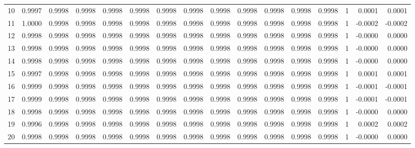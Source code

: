 \begin{tabular}{lrrrrrrrrrrrrrrr}
10  &      0.9997 &  0.9998 &  0.9998 &  0.9998 &  0.9998 &  0.9998 &  0.9998 &  0.9998 &  0.9998 &  0.9998 &   0.9998 &     0.9998 &      1 &                    0.0001 &                     0.0001 \\
11  &      1.0000 &  0.9998 &  0.9998 &  0.9998 &  0.9998 &  0.9998 &  0.9998 &  0.9998 &  0.9998 &  0.9998 &   0.9998 &     0.9998 &      1 &                   -0.0002 &                    -0.0002 \\
12  &      0.9998 &  0.9998 &  0.9998 &  0.9998 &  0.9998 &  0.9998 &  0.9998 &  0.9998 &  0.9998 &  0.9998 &   0.9998 &     0.9998 &      1 &                   -0.0000 &                     0.0000 \\
13  &      0.9998 &  0.9998 &  0.9998 &  0.9998 &  0.9998 &  0.9998 &  0.9998 &  0.9998 &  0.9998 &  0.9998 &   0.9998 &     0.9998 &      1 &                   -0.0000 &                     0.0000 \\
14  &      0.9998 &  0.9998 &  0.9998 &  0.9998 &  0.9998 &  0.9998 &  0.9998 &  0.9998 &  0.9998 &  0.9998 &   0.9998 &     0.9998 &      1 &                   -0.0000 &                     0.0000 \\
15  &      0.9997 &  0.9998 &  0.9998 &  0.9998 &  0.9998 &  0.9998 &  0.9998 &  0.9998 &  0.9998 &  0.9998 &   0.9998 &     0.9998 &      1 &                    0.0001 &                     0.0001 \\
16  &      0.9999 &  0.9998 &  0.9998 &  0.9998 &  0.9998 &  0.9998 &  0.9998 &  0.9998 &  0.9998 &  0.9998 &   0.9998 &     0.9998 &      1 &                   -0.0001 &                    -0.0001 \\
17  &      0.9999 &  0.9998 &  0.9998 &  0.9998 &  0.9998 &  0.9998 &  0.9998 &  0.9998 &  0.9998 &  0.9998 &   0.9998 &     0.9998 &      1 &                   -0.0001 &                    -0.0001 \\
18  &      0.9998 &  0.9998 &  0.9998 &  0.9998 &  0.9998 &  0.9998 &  0.9998 &  0.9998 &  0.9998 &  0.9998 &   0.9998 &     0.9998 &      1 &                   -0.0000 &                     0.0000 \\
19  &      0.9996 &  0.9998 &  0.9998 &  0.9998 &  0.9998 &  0.9998 &  0.9998 &  0.9998 &  0.9998 &  0.9998 &   0.9998 &     0.9998 &      1 &                    0.0002 &                     0.0002 \\
20  &      0.9998 &  0.9998 &  0.9998 &  0.9998 &  0.9998 &  0.9998 &  0.9998 &  0.9998 &  0.9998 &  0.9998 &   0.9998 &     0.9998 &      1 &                   -0.0000 &                     0.0000 \\

\end{tabular}
